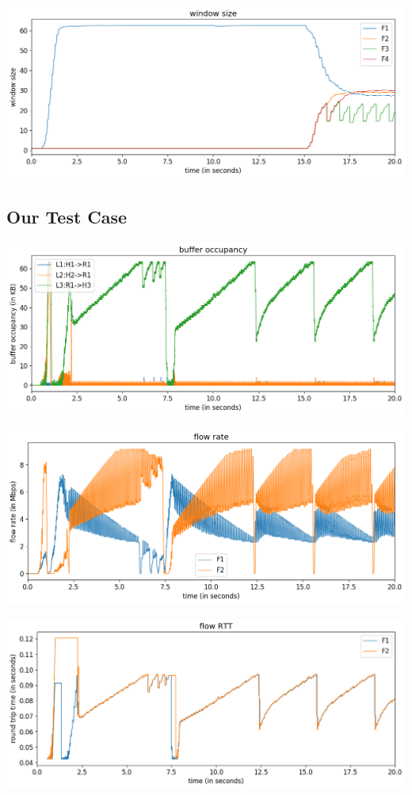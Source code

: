\documentclass{article}
\begin{document}
\includegraphics[width = \textwidth]{"test_case5_fast window size"}




\subsection{Our Test Case}

\includegraphics[width = \textwidth]{"test_case_custom buffer occupancy"}

\includegraphics[width = \textwidth]{"test_case_custom flow rate"}

\includegraphics[width = \textwidth]{"test_case_custom flow RTT"}
\end{document}
